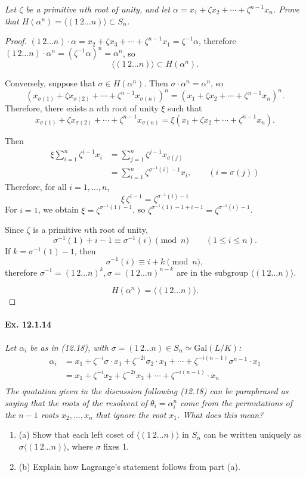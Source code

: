 \documentclass[11pt,a4paper]{article}
\newcommand{\be} {\begin{enumerate}}
\newcommand{\ee} {\end{enumerate}}
\newcommand{\Gal}{\mathrm{Gal}}
\begin{document}
{\it Let $\zeta$ be a primitive $n$th root of unity, and let ${\alpha = x_1+\zeta x_2+\cdots + \zeta^{n-1}x_n}$. Prove that $H(\alpha^n) = \langle (1\,2\ldots n)\rangle \subset S_n$.
}

\begin{proof}
$(1\,2\ldots n)\cdot \alpha =  x_2+\zeta x_3+\cdots + \zeta^{n-1}x_1 = \zeta^{-1} \alpha$, therefore $(1\,2\ldots n)\cdot \alpha^n = (\zeta^{-1} \alpha)^n = \alpha^n$, so 
$$ \langle (1\,2\ldots n)\rangle \subset H(\alpha^n).$$

Conversely, suppose that $\sigma \in H(\alpha^n)$.  Then $\sigma \cdot \alpha^n = \alpha^n$, so
$$(x_{\sigma(1)}+ \zeta x_{\sigma(2)} + \cdots +\zeta^{n-1} x_{\sigma(n)})^n = (x_1+\zeta x_2+\cdots + \zeta^{n-1}x_n)^n.$$
Therefore, there exists a $n$th root of unity $\xi$ such that
$$x_{\sigma(1)}+ \zeta x_{\sigma(2)} + \cdots + \zeta^{n-1} x_{\sigma(n)} = \xi (x_1+\zeta x_2+\cdots + \zeta^{n-1}x_n).$$

Then
\begin{align*}
\xi \sum_{i=1}^n \zeta^{i-1} x_{i} &= \sum_{j=1}^n \zeta^{j-1} x_{\sigma(j)}\\
&=\sum_{i=1}^n \zeta^{\sigma^{-1}(i)-1} x_i, \qquad (i = \sigma(j))
\end{align*}
Therefore, for all $i=1,\ldots,n$,
$$\xi\, \zeta^{i-1} = \zeta^{\sigma^{-1}(i)-1}$$
For $i=1$, we obtain $\xi =\zeta^{\sigma^{-1}(1)-1}$, so $\zeta^{\sigma^{-1}(1)-1+ i-1} = \zeta^{\sigma^{-1}(i)-1}$.

Since $\zeta$ is a primitive $n$th root of unity,
$$\sigma^{-1}(1)+ i-1 \equiv \sigma^{-1}(i) \pmod n \qquad (1\leq i \leq n).$$
If $k = \sigma^{-1}(1) -1$, then 
$$\sigma^{-1}(i) \equiv i+k \pmod n,$$
therefore $\sigma^{-1} = (1\,2\ldots n)^k, \sigma = (1\,2\ldots n)^{n-k}$ are in the subgroup  $\langle (1\,2\ldots n)\rangle$.

$$H(\alpha^n) = \langle (1\,2\ldots n)\rangle.$$
\end{proof}

\paragraph{Ex. 12.1.14}

{\it Let $\alpha_i$ be as in (12.18), with $\sigma = (1\, 2 \ldots n) \in S_n \simeq \Gal(L/K)$:
\begin{align*}
\alpha_i &= x_1+\zeta^{-i} \sigma \cdot x_1+\zeta^{-2i} \sigma_2 \cdot x_1 + \cdots + \zeta^{-i(n-1)} \sigma^{n-1} \cdot x_1\\
&=x_1+\zeta^{-i} x_2 +\zeta^{-2i} x_3 + \cdots + \zeta^{-i(n-1)}\cdot x_n\\
\end{align*}
The quotation given in the discussion following (12.18) can be paraphrased as saying that the roots of the resolvent of $\theta_i =\alpha_i^n$ come from the permutations of the $n-1$ roots $x_2,\ldots,x_n$ that ignore the root $x_1$. What does this mean?
\be
\item[(a)] Show that each left coset of $\langle (1\, 2 \ldots n) \rangle$ in $S_n$ can be written uniquely as $\sigma \langle (1\, 2 \ldots n) \rangle$, where $\sigma$ fixes 1.
\item[(b)] Explain how Lagrange's statement follows from part (a).
\ee
}
\end{document}
